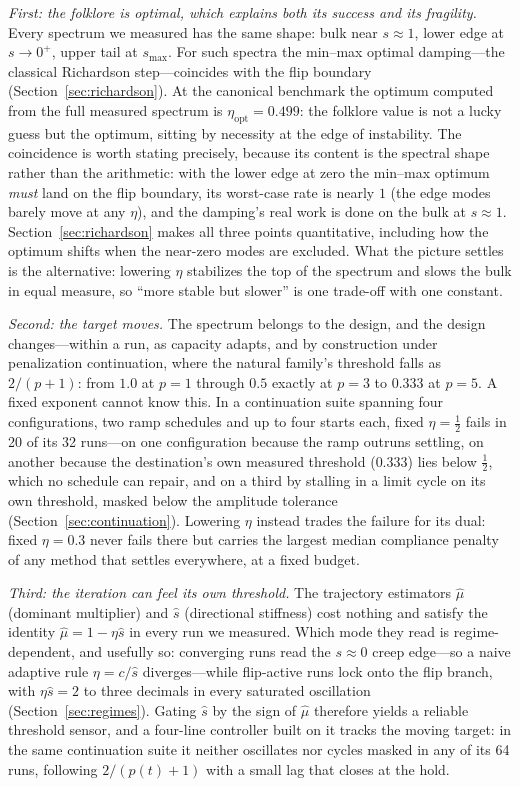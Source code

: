 \documentclass[11pt,a4paper]{article}
\newcommand{\smax}{s_{\max}}
\newcommand{\muh}{\hat{\mu}}
\newcommand{\sh}{\hat{s}}
\begin{document}
\emph{First: the folklore is optimal, which explains both its success
and its fragility.} Every spectrum we measured has the same shape: bulk
near $s\approx1$, lower edge at $s\to0^{+}$, upper tail at $\smax$. For
such spectra the min--max optimal damping---the classical Richardson
step---coincides with the flip boundary
(Section~\ref{sec:richardson}). At the canonical benchmark the optimum
computed from the full measured spectrum is
$\eta_{\mathrm{opt}}=0.499$: the folklore value is not a lucky guess
but the optimum, sitting by necessity at the edge of instability. The
coincidence is worth stating precisely, because its content is the
spectral shape rather than the arithmetic: with the lower edge at zero
the min--max optimum \emph{must} land on the flip boundary, its
worst-case rate is nearly $1$ (the edge modes barely move at any
$\eta$), and the damping's real work is done on the bulk at
$s\approx1$. Section~\ref{sec:richardson} makes all three points
quantitative, including how the optimum shifts when the near-zero modes
are excluded. What the picture settles is the alternative: lowering
$\eta$ stabilizes the top of the spectrum and slows the bulk in equal
measure, so ``more stable but slower'' is one trade-off with one
constant.

\emph{Second: the target moves.} The spectrum belongs to the design,
and the design changes---within a run, as capacity adapts, and by
construction under penalization continuation, where the natural
family's threshold falls as $2/(p{+}1)$: from $1.0$ at $p=1$ through
$0.5$ exactly at $p=3$ to $0.333$ at $p=5$. A fixed exponent cannot
know this. In a continuation suite spanning four configurations, two
ramp schedules and up to four starts each, fixed $\eta=\tfrac12$ fails
in 20 of its 32 runs---on one configuration because the ramp outruns
settling, on another because the destination's own measured threshold
($0.333$) lies below $\tfrac12$, which no schedule can repair, and on a
third by stalling in a limit cycle on its own threshold, masked below
the amplitude tolerance (Section~\ref{sec:continuation}). Lowering
$\eta$ instead trades the failure for its dual: fixed $\eta=0.3$ never
fails there but carries the largest median compliance penalty of any
method that settles everywhere, at a fixed budget.

\emph{Third: the iteration can feel its own threshold.} The trajectory
estimators $\muh$ (dominant multiplier) and $\sh$ (directional
stiffness) cost nothing and satisfy the identity $\muh=1-\eta\sh$ in
every run we measured. Which mode they read is regime-dependent, and
usefully so: converging runs read the $s\approx0$ creep edge---so a
naive adaptive rule $\eta=c/\sh$ diverges---while flip-active runs lock
onto the flip branch, with $\eta\sh=2$ to three decimals in every
saturated oscillation (Section~\ref{sec:regimes}). Gating $\sh$ by the
sign of $\muh$ therefore yields a reliable threshold sensor, and a
four-line controller built on it tracks the moving target: in the same
continuation suite it neither oscillates nor cycles masked in any of
its 64 runs, following
$2/(p(t){+}1)$ with a small lag that closes at the hold.
\end{document}

